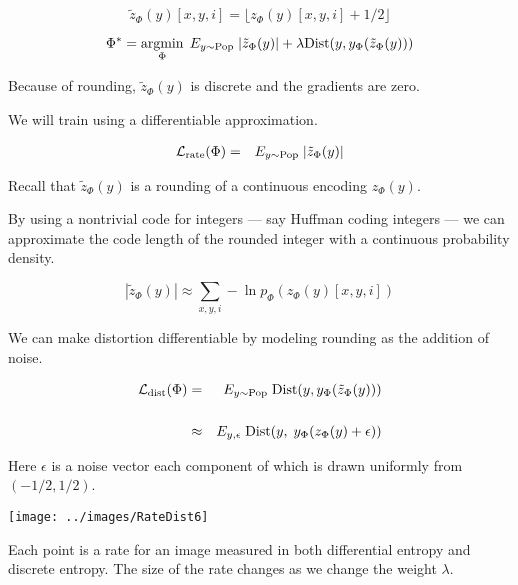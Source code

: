{\vfill
$$\tilde{z}_\Phi(y)[x,y,i] = \lfloor z_\Phi(y)[x,y,i] + 1/2 \rfloor$$


$$\Phi^* = \operatorname*{argmin}_\Phi \;E_{y \sim \mathrm{Pop}}\;|\tilde{z}_\Phi(y)| + \lambda \mathrm{Dist}(y,y_\Phi(\tilde{z}_\Phi(y)))$$

\vfill
Because of rounding, $\tilde{z}_\Phi(y)$ is discrete and the gradients are zero.

\vfill
We will train using a differentiable approximation.


\begin{eqnarray*}
{\cal L}_{\mathrm{rate}}(\Phi) & = & E_{y \sim \mathrm{Pop}}\;|\tilde{z}_\Phi(y)|
\end{eqnarray*}

\vfill
Recall that {\color{red} $\tilde{z}_\Phi(y)$} is a rounding of a continuous encoding {\color{red} $z_\Phi(y)$}.

\vfill
By using a nontrivial code for integers --- say Huffman coding integers ---
we can approximate the code length of the rounded integer with a continuous probability density.

\vfill
{\color{red} $$|\tilde{z}_\Phi(y)| \approx \sum_{x,y,i} -\ln p_\Phi(z_\Phi(y)[x,y,i])$$}


We can make distortion differentiable by modeling rounding as the addition of noise.

\begin{eqnarray*}
{\cal L}_{\mathrm{dist}}(\Phi) & = & E_{y \sim \mathrm{Pop}} \;\mathrm{Dist}(y,y_\Phi(\tilde{z}_\Phi(y))) \\
\\
& \approx & E_{y,\epsilon} \;\mathrm{Dist}(y,\;y_\Phi(z_\Phi(y) + \epsilon))
\end{eqnarray*}

\vfill
Here $\epsilon$ is a noise vector each component of which is drawn uniformly from $(-1/2,1/2)$.


\bigskip
\centerline{\texttt{[image: ../images/RateDist6]}}

Each point is a rate for an image measured in both differential entropy and discrete entropy.  The size of the rate changes as we change the weight $\lambda$.

}
